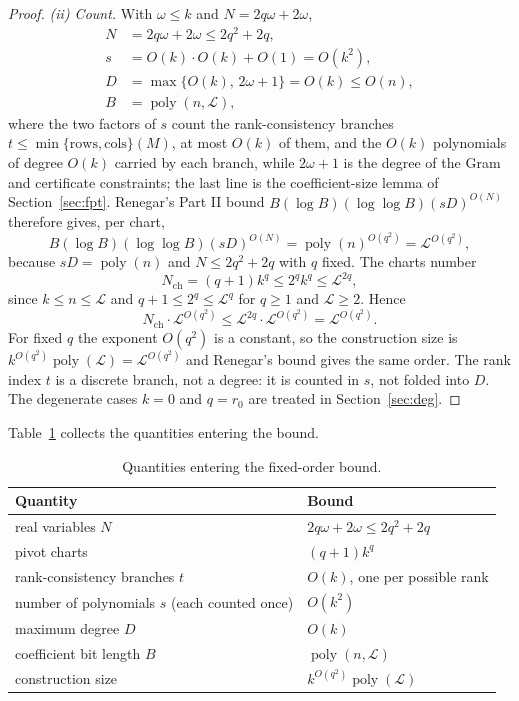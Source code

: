 \documentclass[journal]{IEEEtran}
\theoremstyle{plainn}
\theoremstyle{remark}
\begin{document}
\begin{proof}
\emph{(ii) Count.} With $\omega\le k$ and $N=2q\omega+2\omega$,
\begin{align}
N &= 2q\omega+2\omega\le 2q^2+2q,\\
s &= O(k)\cdot O(k)+O(1)=O(k^2),\\
D &= \max\{O(k),\,2\omega+1\}=O(k)\le O(n),\\
B &= \operatorname{poly}(n,\mathcal L),
\end{align}
where the two factors of $s$ count the rank-consistency branches
$t\le\min\{\text{rows},\text{cols}\}(M)$, at most $O(k)$ of them, and the
$O(k)$ polynomials of degree $O(k)$ carried by each branch, while $2\omega+1$
is the degree of the Gram and certificate constraints; the last line is the
coefficient-size lemma of Section~\ref{sec:fpt}. Renegar's Part II bound
$B(\log B)(\log\log B)(sD)^{O(N)}$ therefore gives, per chart,
\[
B(\log B)(\log\log B)(sD)^{O(N)}
=\operatorname{poly}(n)^{O(q^2)}
=\mathcal L^{O(q^2)},
\]
because $sD=\operatorname{poly}(n)$ and $N\le 2q^2+2q$ with $q$ fixed. The
charts number
\[
N_{\mathrm{ch}}=(q+1)k^{q}\le 2^{q}k^{q}\le\mathcal L^{2q},
\]
since $k\le n\le\mathcal L$ and $q+1\le 2^{q}\le\mathcal L^{q}$ for $q\ge1$
and $\mathcal L\ge2$. Hence
\[
N_{\mathrm{ch}}\cdot\mathcal L^{O(q^2)}
\le\mathcal L^{2q}\cdot\mathcal L^{O(q^2)}
=\mathcal L^{O(q^2)} .
\]
For fixed $q$ the exponent $O(q^2)$ is a constant, so the construction size is
$k^{O(q^2)}\operatorname{poly}(\mathcal L)=\mathcal L^{O(q^2)}$ and Renegar's
bound gives the same order. The rank index $t$ is a discrete branch, not a
degree: it is counted in $s$, not folded into $D$. The degenerate cases $k=0$
and $q=r_0$ are treated in Section~\ref{sec:deg}.
\end{proof}

Table~\ref{tab:4} collects the quantities entering the bound.

\begin{table}[!t]
\centering
\caption{Quantities entering the fixed-order bound.}\label{tab:4}
\small
\begin{tabular}{p{}p{}}
\toprule
Quantity & Bound \\
\midrule
real variables $N$ & $2q\omega+2\omega\le2q^2+2q$ \\
pivot charts & $(q+1)k^q$ \\
rank-consistency branches $t$ & $O(k)$, one per possible rank \\
number of polynomials $s$ (each counted once) & $O(k^2)$ \\
maximum degree $D$ & $O(k)$ \\
coefficient bit length $B$ & $\operatorname{poly}(n,\mathcal L)$ \\
construction size & $k^{O(q^2)}\operatorname{poly}(\mathcal L)$ \\
\bottomrule
\end{tabular}
\end{table}
\end{document}
